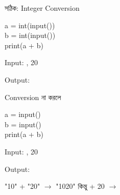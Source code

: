 
\noindent
\begin{minipage}[t]{0.49\linewidth}

\begin{examplebox}{সঠিক: Integer Conversion}

\begin{codebox}
\begin{english}
\ttfamily
a = int(input())\\
b = int(input())\\
print(a + b)
\end{english}
\end{codebox}

Input:
\textenglish{, 20}

\medskip

Output:
\textenglish{}

\end{examplebox}

\end{minipage}
\hfill
\begin{minipage}[t]{0.49\linewidth}

\begin{examplebox}{Conversion না করলে}

\begin{codebox}
\begin{english}
\ttfamily
a = input()\\
b = input()\\
print(a + b)
\end{english}
\end{codebox}

Input:
\textenglish{, 20}

\medskip

Output:
\textenglish{}

\end{examplebox}

\end{minipage}

\begin{rememberbox}

\begin{center}

\textenglish{\ttfamily "10" + "20"}
\(\longrightarrow\)
\textenglish{\ttfamily "1020"}
\qquad
কিন্তু
\qquad
\textenglish{ + 20}
\(\longrightarrow\)
\textenglish{}

\end{center}

\end{rememberbox}

